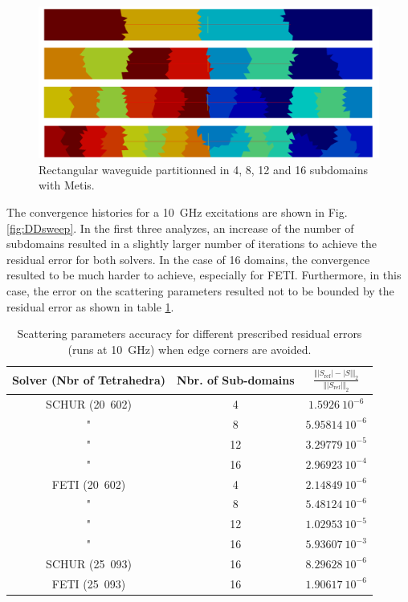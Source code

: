 \begin{figure}[h!]
\centering
\includegraphics[width=\textwidth]{Partitions}
\caption{Rectangular waveguide partitionned in 4, 8, 12 and 16 subdomains with Metis.}
\label{fig:Partitions}
\end{figure}

The convergence histories for a 10~GHz excitations are shown in Fig. \ref{fig:DDsweep}. In the first three analyzes, an increase of the number of subdomains resulted in a slightly larger number of iterations to achieve the residual error for both solvers. In the case of 16 domains, the convergence resulted to be much harder to achieve, especially for FETI. Furthermore, in this case, the error on the scattering parameters resulted not to be bounded by the residual error as shown in table \ref{tab:SaccDDSweep}.

\begin{table}[h]
\begin{center}
\begin{tabular}{|c|c|c|}
\hline 
Solver (Nbr of Tetrahedra) & Nbr. of Sub-domains & $\frac{\Vert |S_\mathrm{ref}| - |S| \Vert_{2}}{\Vert|S_\mathrm{ref}|\Vert_2}$\\ 
\hline \hline 
\setlength{\arrayrulewidth}{0.5pt}
SCHUR (20~602) & 4 & $1.5926~10^{-6}$\\ \hline 
"& 8 & $5.95814~10^{-6}$\\ \hline 
"& 12 &  $3.29779~10^{-5}$\\ \hline 
"& 16 & $2.96923~10^{-4}$\\ \hline
FETI (20~602) & 4 & $2.14849~10^{-6}$\\ \hline 
"& 8  & $5.48124~10^{-6}$\\ \hline 
"& 12 & $1.02953~10^{-5}$\\ \hline 
"& 16 & $5.93607~10^{-3}$\\ \hline
SCHUR (25~093) & 16 & $8.29628~10^{-6}$\\ \hline 
FETI (25~093) & 16 & $1.90617~10^{-6}$\\ \hline 
\end{tabular}
\end{center}
\caption{Scattering parameters accuracy for different prescribed residual errors (runs at 10~GHz) when edge corners are avoided.}
\label{tab:SaccDDSweep}
\end{table}

